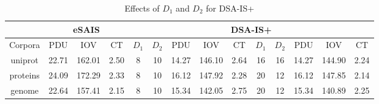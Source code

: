 \documentclass[10pt,journal,compsoc]{IEEEtran}
\begin{document}
\begin{table}[htbp]
	\caption{Effects of $D_1$ and $D_2$ for DSA-IS+}
	\label{tbl:effect_of_D}
	\centering
	\begin{tabular}{|c|c|c|c|c|c|c|c|c||c|c|c|c|c|}
		\hline
		\multicolumn{1}{|c}{} & \multicolumn{3}{|c}{eSAIS} & \multicolumn{10}{|c|}{DSA-IS+}\\\hline
		\hline
		Corpora & PDU & IOV & CT & $D_1$ & $D_2$ & PDU & IOV & CT  & $D_1$ & $D_2$ & PDU & IOV & CT\\\hline
		uniprot & 22.71 & 162.01 & 2.50 & 8 & 10 & 14.27 & 146.10 & 2.64 & 16 & 16 & 14.27 & 144.90 & 2.24 \\\hline
		proteins & 24.09 & 172.29 & 2.33 & 8 & 10 & 16.12 & 147.92 & 2.28 & 20 & 12 & 16.12 & 147.85 & 2.14 \\\hline
		genome & 22.64 & 157.41 & 2.15 & 8 & 10 & 15.34 & 142.05 & 2.75 & 20 & 12 & 15.34 & 140.89 & 2.25 \\\hline
	\end{tabular}
\end{table}%
\end{document}
